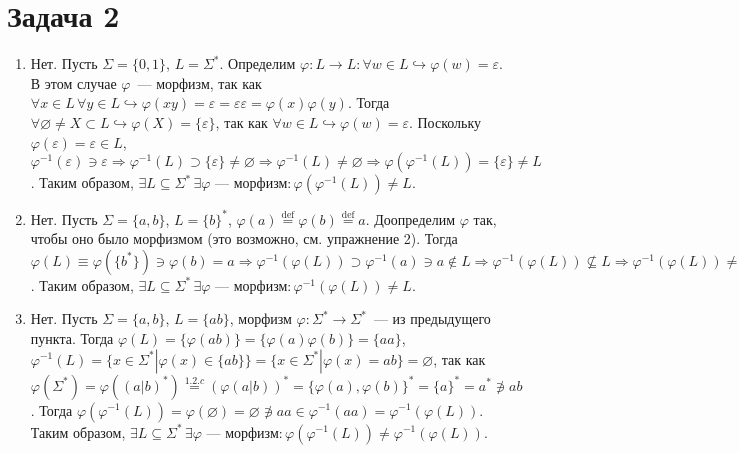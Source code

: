 \documentclass[a4paper]{article}
\newcommand{\niton}{\not\owns}
\begin{document}
\section*{Задача 2}
\begin{enumerate}[1.]
\item Нет. Пусть $\Sigma=\{0,1\}$, $L=\Sigma^*$. Определим $\varphi\colon L\longrightarrow L\colon \forall w\in L\hookrightarrow\varphi(w)=\varepsilon$. В этом случае $\varphi$~--- морфизм, так как $\forall x\in L\,\forall y\in L\hookrightarrow\varphi(xy)=\varepsilon=\varepsilon\varepsilon=\varphi(x)\varphi(y)$. Тогда $\forall \varnothing\neq X\subset L\hookrightarrow\varphi(X)=\{\varepsilon\}$, так как $\forall w\in L\hookrightarrow\varphi(w)=\varepsilon$. Поскольку $\varphi(\varepsilon)=\varepsilon\in L$, $\varphi^{-1}(\varepsilon)\ni\varepsilon\Rightarrow \varphi^{-1}(L)\supset\{\varepsilon\}\neq\varnothing\Rightarrow\varphi^{-1}(L)\neq\varnothing\Rightarrow\varphi(\varphi^{-1}(L))=\{\varepsilon\}\neq L$.\newline
Таким образом, $\exists L\subseteq\Sigma^*\,\exists\varphi\mbox{~--- морфизм}\colon \varphi(\varphi^{-1}(L))\neq L$.
\item Нет. Пусть $\Sigma=\{a,b\}$, $L=\{b\}^*$, $\varphi(a)\overset{\mathrm{def}}{=}\varphi(b)\overset{\mathrm{def}}{=}a$. Доопределим $\varphi$ так, чтобы оно было морфизмом (это возможно, см. упражнение 2). Тогда $\varphi(L)\equiv\varphi(\{b^*\})\ni\varphi(b)=a\Rightarrow\varphi^{-1}(\varphi(L))\supset\varphi^{-1}(a)\ni a\notin L\Rightarrow \varphi^{-1}(\varphi(L))\nsubseteq L\Rightarrow\varphi^{-1}(\varphi(L))\neq L$.\newline
Таким образом, $\exists L\subseteq\Sigma^*\,\exists\varphi\mbox{~--- морфизм}\colon \varphi^{-1}(\varphi(L))\neq L$.
\item Нет. Пусть $\Sigma=\{a,b\}$, $L=\{ab\}$, морфизм $\varphi\colon\Sigma^*\longrightarrow\Sigma^*$~--- из предыдущего пункта. Тогда $\varphi(L)=\{\varphi(ab)\}=\{\varphi(a)\varphi(b)\}=\{aa\}$, $\varphi^{-1}(L)=\{x\in\Sigma^*|\varphi(x)\in\{ab\}\}=\{x\in\Sigma^*|\varphi(x)=ab\}=\varnothing$, так как $\varphi(\Sigma^*)=\varphi((a|b)^*)\overset{1.2.c}{=}(\varphi(a|b))^*=\{\varphi(a),\varphi(b)\}^*=\{a\}^*=a^*\niton ab$. Тогда $\varphi(\varphi^{-1}(L))=\varphi(\varnothing)=\varnothing\niton aa \in\varphi^{-1}(aa)=\varphi^{-1}(\varphi(L))$.\newline
Таким образом, $\exists L\subseteq\Sigma^*\,\exists\varphi\mbox{~--- морфизм}\colon \varphi(\varphi^{-1}(L))\neq \varphi^{-1}(\varphi(L))$.

\end{enumerate}
\end{document}
